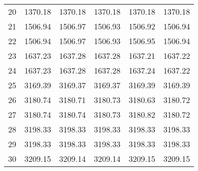 \documentclass[10pt,oneside]{article}
\begin{document}
\begin{table}[h!]
\begin{tabular}{cccccc}
20 &   1370.18 & 1370.18 &    1370.18 & 1370.18 &   1370.18 \\
21 &   1506.94 & 1506.97 &    1506.93 & 1506.92 &   1506.94 \\
22 &   1506.94 & 1506.97 &    1506.93 & 1506.95 &   1506.94 \\
23 &   1637.23 & 1637.28 &    1637.28 & 1637.21 &   1637.22 \\
24 &   1637.23 & 1637.28 &    1637.28 & 1637.24 &   1637.22 \\
25 &   3169.39 & 3169.37 &    3169.37 & 3169.39 &   3169.39 \\
26 &   3180.74 & 3180.71 &    3180.73 & 3180.63 &   3180.72 \\
27 &   3180.74 & 3180.74 &    3180.73 & 3180.82 &   3180.72 \\
28 &   3198.33 & 3198.33 &    3198.33 & 3198.33 &   3198.33 \\
29 &   3198.33 & 3198.33 &    3198.33 & 3198.33 &   3198.33 \\
30 &   3209.15 & 3209.14 &    3209.14 & 3209.15 &   3209.15 \\
\bottomrule
\end{tabular}
\end{table}
\end{document}
